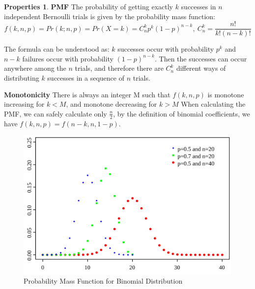 \documentclass{article}
\theoremstyle{definition}
\newtheorem{prop}{Properties}[section]
\begin{document}
\begin{prop}
\textbf{PMF} The probability of getting exactly $k$ successes in $n$ independent Bernoulli trials is given by the probability mass function: $$f(k,n,p)=Pr(k;n,p)=Pr(X=k)=C_{n}^{k}p^k(1-p)^{n-k}, \: C_{n}^{k}=\frac{n!}{k!(n-k)!}$$

The formula can be understood as: $k$ successes occur with probability $p^k$ and $n-k$ failures occur with probability $(1-p)^{n-k}$. Then the successes can occur anywhere among the $n$ trials, and therefore there are $C_{n}^{k}$ different ways of distributing $k$ successes in a sequence of $n$ trials.

\textbf{Monotonicity} There is always an integer M such that $f(k,n,p)$ is monotone increasing for $k<M$, and monotone decreasing for $k>M$
When calculating the PMF, we can safely calculate only $\frac{n}{2}$, by the definition of binomial coefficients, we have $f(k,n,p)=f(n-k,n,1-p)$.

\begin{figure}[h]
\caption{Probability Mass Function for Binomial Distribution}
\centering
\includegraphics[width=\textwidth]{Statistics/images/Binomial_distribution_pmf.pdf}
\end{figure}

\end{prop}
\end{document}
